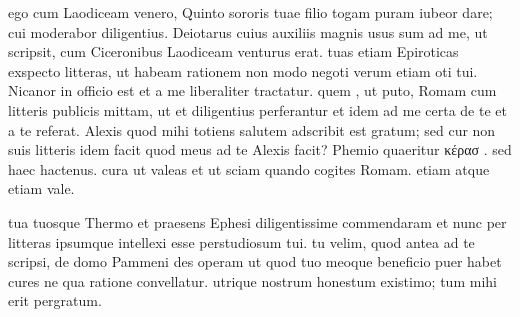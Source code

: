  ego cum Laodiceam venero, Quinto sororis tuae filio togam puram iubeor dare; cui moderabor diligentius. Deiotarus cuius auxiliis magnis usus sum ad me, ut scripsit, cum Ciceronibus Laodiceam venturus erat. tuas etiam Epiroticas exspecto litteras, ut habeam rationem non modo negoti verum etiam oti tui. Nicanor in officio est et a me liberaliter tractatur. quem , ut puto, Romam cum litteris publicis mittam, ut et diligentius perferantur et idem ad me certa de te et a te referat. Alexis quod mihi totiens salutem adscribit est gratum; sed cur non suis litteris idem facit quod meus ad te Alexis facit? Phemio quaeritur κέρασ . sed haec hactenus. cura ut valeas et ut sciam quando cogites Romam. etiam atque etiam vale.

 tua tuosque Thermo et praesens Ephesi diligentissime commendaram et nunc per litteras ipsumque intellexi esse perstudiosum tui. tu velim, quod antea ad te scripsi, de domo Pammeni des operam ut quod tuo meoque beneficio puer habet cures ne qua ratione convellatur. utrique nostrum honestum existimo; tum mihi erit pergratum.
